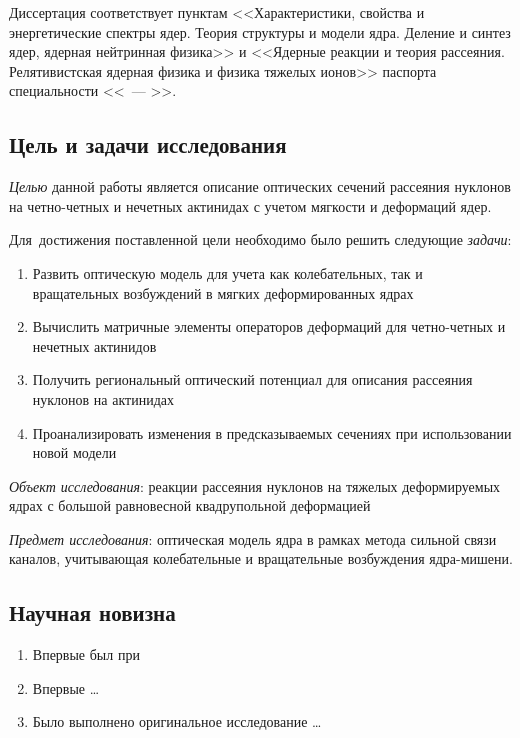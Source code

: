Диссертация соответствует пунктам <<Характеристики, свойства и энергетические спектры ядер. Теория структуры и модели ядра. Деление и синтез ядер, ядерная нейтринная физика>> и <<Ядерные реакции и теория рассеяния. Релятивистская ядерная физика и физика тяжелых ионов>> паспорта специальности <<\thesisSpecialtyNumber~--- \thesisSpecialtyTitle>>.


\subsection*{Цель и задачи исследования}

\textit{Целью} данной работы является описание оптических сечений рассеяния нуклонов на четно-четных и нечетных актинидах с учетом мягкости и деформаций ядер.

Для~достижения поставленной цели необходимо было решить следующие \textit{задачи}:
\begin{enumerate}[beginpenalty=10000] %
	\item Развить оптическую модель для учета как колебательных, так и вращательных возбуждений в мягких деформированных ядрах
	\item Вычислить матричные элементы операторов деформаций для четно-четных и нечетных актинидов
	\item Получить региональный оптический потенциал для описания рассеяния нуклонов на актинидах
	\item Проанализировать изменения в предсказываемых сечениях при использовании новой модели
\end{enumerate}


\textit{Объект исследования}: реакции рассеяния нуклонов на тяжелых деформируемых ядрах с большой равновесной квадрупольной деформацией


\textit{Предмет исследования}: оптическая модель ядра в рамках метода сильной связи каналов, учитывающая колебательные и вращательные возбуждения ядра-мишени.

\subsection*{Научная новизна}

\begin{enumerate}[beginpenalty=10000] %
	\item Впервые был при
	\item Впервые \ldots
	\item Было выполнено оригинальное исследование \ldots
\end{enumerate}

